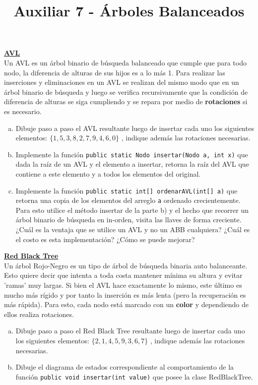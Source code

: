 \documentclass[dcc,uchile,sol]{fcfmcourse}
\title{Auxiliar 7 - Árboles Balanceados}
\newcommand{\ptitle}[1]{\underline{\textbf{#1}}}
\begin{document}
\maketitle

\vspace{-1ex}


\begin{problems}
\problem \ptitle{AVL}\\
Un AVL es un árbol binario de búsqueda balanceado que cumple que para todo nodo, la diferencia de alturas de sus hijos es a lo más 1. Para realizar las inserciones y eliminaciones en un AVL se realizan del mismo modo que en un árbol binario de búsqueda y luego se verifica recursivamente que la condición de diferencia de alturas se siga cumpliendo y se repara por medio de \textbf{rotaciones} si es necesario.
\begin{enumerate}[a)]
    \item Dibuje paso a paso el AVL resultante luego de insertar cada uno los siguientes elementos: $\{1, 5, 3, 8, 2, 7, 9, 4, 6, 0\}$ , indique además las rotaciones necesarias.
    \item Implemente la función \texttt{public static Nodo insertar(Nodo a, int x)} que dada la raíz de un AVL y el elemento a insertar, retorna la raíz del AVL que contiene a este elemento y a todos los elementos del original.
    \item Implemente la función \texttt{public static int[] ordenarAVL(int[] a)} que retorna una copia de los elementos del arreglo \texttt{a} ordenado crecientemente. Para esto utilice el método insertar de la parte b) y el hecho que recorrer un árbol binario de búsqueda en in-orden, visita las llaves de forma creciente. ¿Cuál es la ventaja que se utilice un AVL y no un ABB cualquiera? ¿Cuál es el costo es esta implementación? ¿Cómo se puede mejorar?
\end{enumerate}

\problem \ptitle{Red Black Tree}\\
Un árbol Rojo-Negro es un tipo de árbol de búsqueda binaria auto balanceante. Esto quiere decir que intenta a toda costa mantener mínima su altura y evitar 'ramas' muy largas. Si bien el AVL hace exactamente lo mismo, este último es mucho más rígido y por tanto la inserción es más lenta (pero la recuperación es más rápida). Para esto, cada nodo está marcado con un \textbf{color} y dependiendo de ellos realiza rotaciones.
\begin{enumerate}[a)]
    \item Dibuje paso a paso el Red Black Tree resultante luego de insertar cada uno los siguientes elementos: $\{2, 1, 4, 5, 9, 3, 6, 7\}$ , indique además las rotaciones necesarias.
    \item Dibuje el diagrama de estados correspondiente al comportamiento de la función \texttt{public void insertar(int value)} que posee la clase RedBlackTree.
\end{enumerate}
\end{problems}
\end{document}
